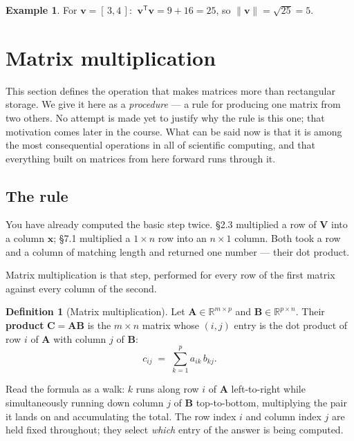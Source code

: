 \documentclass[11pt]{article}
\theoremstyle{plain}
\theoremstyle{definition}
\newtheorem{defn}{Definition}[section]
\newtheorem{ex}{Example}[section]
\theoremstyle{remark}
\newcommand{\R}{\mathbb{R}}
\newcommand{\vc}[1]{\mathbf{#1}}        %
\newcommand{\mt}[1]{\mathbf{#1}}        %
\newcommand{\norm}[1]{\lVert #1\rVert}
\newcommand{\T}{^{\mathsf{T}}}          %
\begin{document}
\begin{ex}
For $\vc{v}=[\,3,4\,]$: $\ \vc{v}\T\vc{v}=9+16=25$, so
$\norm{\vc{v}}=\sqrt{25}=5$. \checkmark
\end{ex}

\section{Matrix multiplication}
This section defines the operation that makes matrices more than rectangular
storage. We give it here as a \emph{procedure} --- a rule for producing one
matrix from two others. No attempt is made yet to justify why the rule is
this one; that motivation comes later in the course. What can be said now is
that it is among the most consequential operations in all of scientific
computing, and that everything built on matrices from here forward runs
through it.

\subsection{The rule}
You have already computed the basic step twice. \S2.3 multiplied a row of
$\mt{V}$ into a column $\vc{x}$; \S7.1 multiplied a $1\times n$ row into an
$n\times1$ column. Both took a row and a column of matching length and returned
one number --- their dot product.

Matrix multiplication is that step, performed for every row of the first matrix
against every column of the second.

\begin{defn}[Matrix multiplication]
Let $\mt{A}\in\R^{m\times p}$ and $\mt{B}\in\R^{p\times n}$. Their
\textbf{product} $\mt{C}=\mt{A}\mt{B}$ is the $m\times n$ matrix whose $(i,j)$
entry is the dot product of row $i$ of $\mt{A}$ with column $j$ of $\mt{B}$:
\[
  c_{ij} \;=\; \sum_{k=1}^{p} a_{ik}\,b_{kj} .
\]
\end{defn}

\noindent Read the formula as a walk: $k$ runs along row $i$ of $\mt{A}$
left-to-right while simultaneously running down column $j$ of $\mt{B}$
top-to-bottom, multiplying the pair it lands on and accumulating the total. The
row index $i$ and column index $j$ are held fixed throughout; they select
\emph{which} entry of the answer is being computed.
\end{document}
